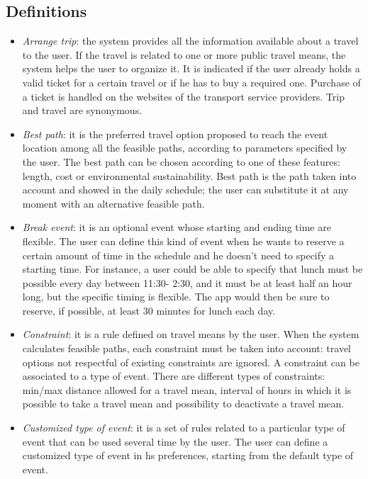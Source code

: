 \subsection{Definitions}
	\begin{itemize}
	\item \textit{Arrange trip}: the system provides all the information available about a travel to the user. If the travel is related to one or more public travel means, the system helps the user to organize it. It is indicated if the user already holds a valid ticket for a certain travel or if he has to buy a required one. Purchase of a ticket is handled on the websites of the transport service providers. Trip and travel are synonymous.
	\item \textit{Best path}: it is the preferred travel option proposed to reach the event location among all the feasible paths, according to parameters specified by the user. The best path can be chosen according to one of these features: length, cost or environmental sustainability. Best path is the path taken into account and showed in the daily schedule; the user can substitute it at any moment with an alternative feasible path. 
	\item \textit{Break event}: it is an optional event whose starting and ending time are flexible. The user can define this kind of event when he wants to reserve a certain amount of time in the schedule and he doesn't need to specify a starting time. For instance, a user could be able to specify that lunch must be possible every day between 11:30-
2:30, and it must be at least half an hour long, but the specific timing is flexible. The app would then be sure to reserve, if possible, at least 30 minutes for lunch each day.
	\item \textit{Constraint}: it is a rule defined on travel means by the user. When the system calculates feasible paths, each constraint must be taken into account: travel options not respectful of existing constraints are ignored. A constraint can be associated to a type of event. 
	\newline
	There are different types of constraints: min/max distance allowed for a travel mean, interval of hours in which it is possible to take a travel mean and possibility to deactivate a travel mean. 
	\item \textit{Customized type of event}: it is a set of rules related to a particular type of event that can be used several time by the user. The user can define a customized type of event in hs preferences, starting from the default type of event.	

\end{itemize}
